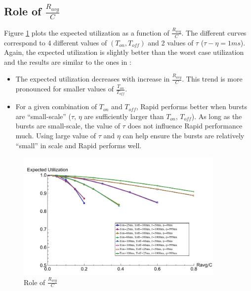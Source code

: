   \subsection{Role of $\frac{R_{avg}}{C}$}
    Figure \ref{rttravgc} plots the expected utilization as a function of 
    $\frac{R_{avg}}{C}$. The different curves correspond to 4 different 
    values of $(T_{on}, T_{off})$ and 2 values of 
    $\tau$ ($\tau - \eta = 1ms$). Again, the expected utilization is slightly 
    better than the worst case utilization and the results are similar to the 
    ones in \cite{Lovewell2011-Noise-TR}:
    \begin{itemize}
      \item The expected utilization decreases with increase in 
      $\frac{R_{avg}}{C}$. This trend is more pronounced for smaller values of 
      $\frac{T_{on}}{T_{off}}$.
      \item For a given combination of $T_{on}$ and $T_{off}$, Rapid performs 
      better when bursts are ``small-scale'' ($\tau$, $\eta$ are sufficiently 
      larger than $T_{on}$, $T_{off}$). As long as the bursts are 
      small-scale, the value of $\tau$ does not influence Rapid performance 
      much. Using large value of $\tau$ and $\eta$ can help ensure the 
      bursts are relatively ``small'' in scale and Rapid performs well.
    \end{itemize}
    \begin{figure}[!htb]
      \centering
      \includegraphics[width=0.9\textwidth]{img/rttravgc.pdf}
      \caption{Role of $\frac{R_{avg}}{C}$}
      \label{rttravgc}
    \end{figure}

